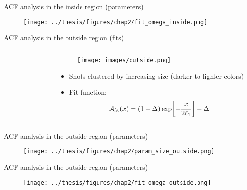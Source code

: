 \documentclass[aspectratio=169]{beamer}
\begin{document}
\begin{frame}{ACF analysis in the inside region (parameters)}
  \begin{figure}
      \centering
      \texttt{[image: ../thesis/figures/chap2/fit\_omega\_inside.png]}
  \end{figure}
\end{frame}

\begin{frame}{ACF analysis in the outside region (fits)}
  \begin{columns}
    \begin{column}{0.55\textwidth}
      \begin{figure}
        \centering
      \end{figure}
    \end{column}
    \begin{column}{0.45\textwidth}
      \begin{figure}
        \centering
        \texttt{[image: images/outside.png]}
      \end{figure}
      \begin{itemize}
        \item Shots clustered by increasing size (darker to lighter colors)
        \item Fit function:
        \[
          \mathcal{A}_{\rm fit}(x) = (1-\Delta)\exp[-\frac{x}{2\ell_1}] + \Delta
        \]
      \end{itemize}
    \end{column}
  \end{columns}
\end{frame}

\begin{frame}{ACF analysis in the outside region (parameters)}
  \begin{figure}
    \centering
    \texttt{[image: ../thesis/figures/chap2/param\_size\_outside.png]}
  \end{figure}
\end{frame}

\begin{frame}{ACF analysis in the outside region (parameters)}
  \begin{figure}
      \centering
      \texttt{[image: ../thesis/figures/chap2/fit\_omega\_outside.png]}
  \end{figure}
\end{frame}
\end{document}
